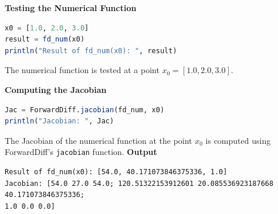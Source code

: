 \textbf{Testing the Numerical Function}
\begin{lstlisting}[language=Julia]
x0 = [1.0, 2.0, 3.0]
result = fd_num(x0)
println("Result of fd_num(x0): ", result)
\end{lstlisting}
The numerical function is tested at a point \( x_0 = [1.0, 2.0, 3.0] \).

\textbf{Computing the Jacobian}
\begin{lstlisting}[language=Julia]
Jac = ForwardDiff.jacobian(fd_num, x0)
println("Jacobian: ", Jac)
\end{lstlisting}
The Jacobian of the numerical function at the point \( x_0 \) is computed using ForwardDiff's \texttt{jacobian} function.
\textbf{Output} 
\begin{verbatim}
Result of fd_num(x0): [54.0, 40.171073846375336, 1.0]
Jacobian: [54.0 27.0 54.0; 120.51322153912601 20.085536923187668 40.171073846375336; 
1.0 0.0 0.0]
\end{verbatim}

\begin{center}
\setlength{\fboxrule}{2pt}  %
\end{center}


